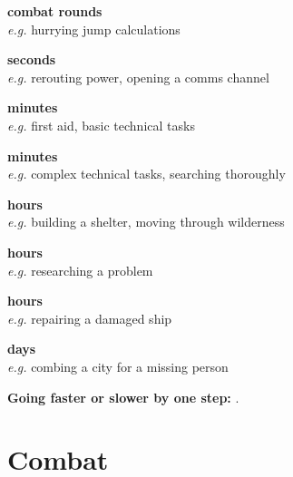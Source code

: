 \documentclass{cheatsheet}
\begin{document}
\begin{multicols}{3}
\textbf{ combat rounds}\\
\textit{e.g.} hurrying jump calculations

\textbf{ seconds}\\
\textit{e.g.} rerouting power, opening a comms channel

\textbf{ minutes}\\
\textit{e.g.} first aid, basic technical tasks

\textbf{ minutes}\\
\textit{e.g.} complex technical tasks, searching thoroughly

\textbf{ hours}\\
\textit{e.g.} building a shelter, moving through wilderness

\textbf{ hours}\\
\textit{e.g.} researching a problem

\textbf{ hours}\\
\textit{e.g.} repairing a damaged ship

\textbf{ days}\\
\textit{e.g.} combing a city for a missing person

\textbf{Going faster or slower by one step:} .
\end{multicols}

\section{Combat}
\end{document}
